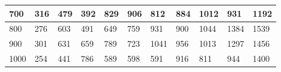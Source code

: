 \documentclass[10pt,letterpaper]{article}
\begin{document}
\begin{center}
\begin{table}
\begin{tabular} { |m{0.5cm}|m{1.3cm}|m{1.3cm}|m{1.3cm}|m{1.3cm}|m{1.3cm}|m{1.3cm}|m{1.3cm}|m{1.3cm}|m{1.3cm}|m{1.3cm}|}
\hline
\cellcolor{Gray}700 & \Large 316 & \Large 479 & \Large 392 & \Large 829 & \Large 906 & \Large 812 & \Large 884 & \Large 1012 & \Large 931 & \Large 1192 \\
\hline
\cellcolor{Gray}800 & \Large 276 & \Large 603 & \Large 491 & \Large 649 & \Large 759 & \Large 931 & \Large 900 & \Large 1044 & \Large 1384 & \Large 1539 \\
\hline
\cellcolor{Gray}900 & \Large 301 & \Large 631 & \Large 659 & \Large 789 & \Large 723 & \Large 1041 & \Large 956 & \Large 1013 & \Large 1297 & \Large 1456 \\
\hline
\cellcolor{Gray}1000 & \Large 254 & \Large 441 & \Large 786 & \Large 589 & \Large 598 & \Large 591 & \Large 916 & \Large 811 & \Large 944 & \Large 1400 \\
\hline
\end{tabular} \\
\end{table}
\end{center}
\newpage 
{}
\end{document}
